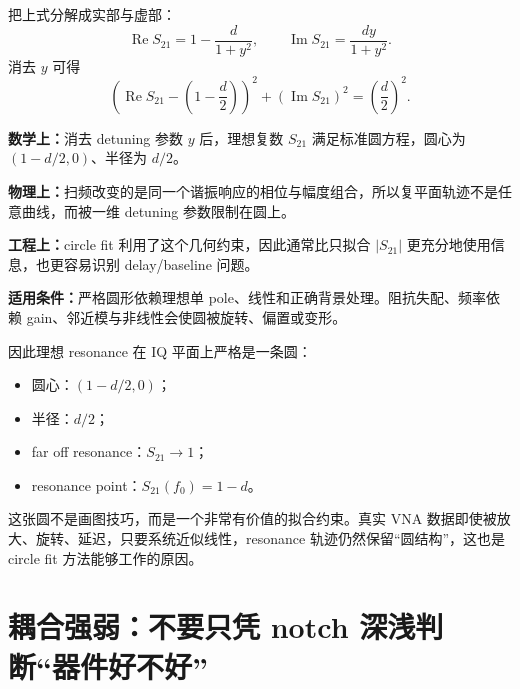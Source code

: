 \documentclass[11pt,a4paper,openany]{ctexrep}
\newcommand{\formulaexplain}[4]{%
\begin{formulaguidebox}
\textbf{\color{KidBlue}数学上：}#1\par
\textbf{\color{KidTeal}物理上：}#2\par
\textbf{\color{KidGold!55!black}工程上：}#3\par
\textbf{\color{KidRed}适用条件：}#4
\end{formulaguidebox}%
}
\begin{document}
把上式分解成实部与虚部：
\[
\operatorname{Re}S_{21}=1-\frac{d}{1+y^2},
\qquad
\operatorname{Im}S_{21}=\frac{dy}{1+y^2}.
\]
消去 $y$ 可得
\[
\boxed{
\left(\operatorname{Re}S_{21}-\left(1-\frac d2\right)\right)^2
+
\left(\operatorname{Im}S_{21}\right)^2
=
\left(\frac d2\right)^2.
}
\]
\formulaexplain
{消去 detuning 参数 $y$ 后，理想复数 $S_{21}$ 满足标准圆方程，圆心为 $(1-d/2,0)$、半径为 $d/2$。}
{扫频改变的是同一个谐振响应的相位与幅度组合，所以复平面轨迹不是任意曲线，而被一维 detuning 参数限制在圆上。}
{circle fit 利用了这个几何约束，因此通常比只拟合 $|S_{21}|$ 更充分地使用信息，也更容易识别 delay/baseline 问题。}
{严格圆形依赖理想单 pole、线性和正确背景处理。阻抗失配、频率依赖 gain、邻近模与非线性会使圆被旋转、偏置或变形。}
因此理想 resonance 在 IQ 平面上严格是一条圆：
\begin{itemize}
  \item 圆心：$\left(1-d/2,0\right)$；
  \item 半径：$d/2$；
  \item far off resonance：$S_{21}\rightarrow1$；
  \item resonance point：$S_{21}(f_0)=1-d$。
\end{itemize}

\begin{center}
\end{center}

这张圆不是画图技巧，而是一个非常有价值的拟合约束。真实 VNA 数据即使被放大、旋转、延迟，只要系统近似线性，resonance 轨迹仍然保留“圆结构”，这也是 circle fit 方法能够工作的原因。

\section{耦合强弱：不要只凭 notch 深浅判断“器件好不好”}
\end{document}
